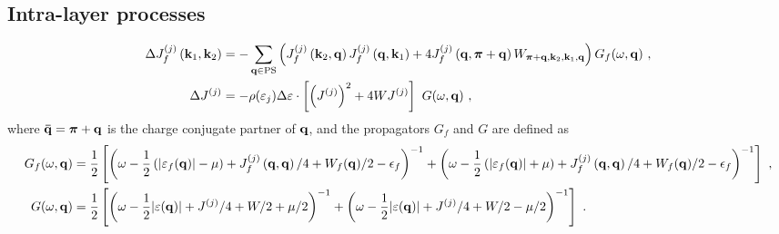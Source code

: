 \documentclass[%
reprint,
superscriptaddress,
groupedaddress,
superscriptaddress,
onecolumn,
10pt
]{revtex4-2}
\begin{document}
\subsection{Intra-layer processes}
\begin{equation}\begin{aligned}
	\Delta J_f^{(j)}\left({\bf k}_1, {\bf k}_2\right) &= -\sum_{{\bf q} \in \text{PS}} \left(J_f^{(j)}\left({\bf k}_2,{\bf q}\right) J_f^{(j)}\left({\bf q},{\bf k}_1\right) + 4J_f^{(j)}\left({\bf q}, {\boldsymbol \pi} + {\bf q}\right) W_{{\boldsymbol \pi} + {\bf q}, {\bf k}_2, {\bf k}_1, {\bf q}}\right) G_f(\omega, {\bf q})~,\\
	\Delta J^{(j)} &= - \rho(\varepsilon_j)\Delta \varepsilon\cdot\left[\left(J^{(j)}\right)^2 + 4WJ^{(j)}\right]~G(\omega, {\bf q})~,
\end{aligned}\end{equation}
where \({\bf \bar q} = {\boldsymbol \pi} + {\bf q}\) is the charge conjugate partner of \({\bf q}\), and the propagators \(G_f\) and \(G\) are defined as
\begin{equation}\begin{aligned}\label{propagators}
	G_f(\omega,{\bf q}) &= \frac{1}{2}\left[\left(\omega - \frac{1}{2}\left(|\varepsilon_f({\bf q})| - \mu\right) + J^{(j)}_f\left({\bf q},{\bf q}\right)/4 + W_f({\bf q})/2 - \epsilon_f\right)^{-1} + \left(\omega - \frac{1}{2}\left(|\varepsilon_f({\bf q})| + \mu\right) + J^{(j)}_f\left({\bf q},{\bf q}\right)/4 + W_f({\bf q})/2 - \epsilon_f\right)^{-1}\right] ~,\\
	G(\omega,{\bf q}) &= \frac{1}{2}\left[\left(\omega - \frac{1}{2}|\varepsilon({\bf q})| + J^{(j)}/4 + W/2 + \mu/2\right)^{-1} + \left(\omega - \frac{1}{2}|\varepsilon({\bf q})| + J^{(j)}/4 + W/2 - \mu/2\right)^{-1}\right] ~.
\end{aligned}\end{equation}
\end{document}
